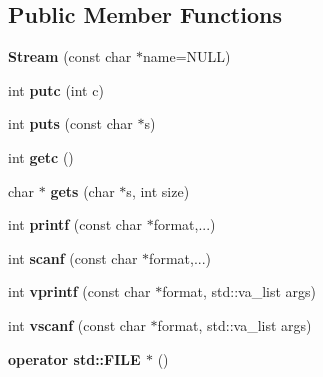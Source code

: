 \subsection*{Public Member Functions}
\begin{DoxyCompactItemize}
\item 
{\bfseries Stream} (const char $\ast$name=N\+U\+LL)\hypertarget{classmbed_1_1Stream_a32d590dce747212c986b9c8fa8f626f8}{}\label{classmbed_1_1Stream_a32d590dce747212c986b9c8fa8f626f8}

\item 
int {\bfseries putc} (int c)\hypertarget{classmbed_1_1Stream_ae948b0f3eaf7736ca0f6a1648e9390d6}{}\label{classmbed_1_1Stream_ae948b0f3eaf7736ca0f6a1648e9390d6}

\item 
int {\bfseries puts} (const char $\ast$s)\hypertarget{classmbed_1_1Stream_aaf7d4a2bb6c38f35d369f51cb2e3ba36}{}\label{classmbed_1_1Stream_aaf7d4a2bb6c38f35d369f51cb2e3ba36}

\item 
int {\bfseries getc} ()\hypertarget{classmbed_1_1Stream_a6167659331a6d841b0f766c4db1333e5}{}\label{classmbed_1_1Stream_a6167659331a6d841b0f766c4db1333e5}

\item 
char $\ast$ {\bfseries gets} (char $\ast$s, int size)\hypertarget{classmbed_1_1Stream_ab5157ace501d836fba9fd3f40b8865d1}{}\label{classmbed_1_1Stream_ab5157ace501d836fba9fd3f40b8865d1}

\item 
int {\bfseries printf} (const char $\ast$format,...)\hypertarget{classmbed_1_1Stream_adca0a93ea6add55996848e0f4e148533}{}\label{classmbed_1_1Stream_adca0a93ea6add55996848e0f4e148533}

\item 
int {\bfseries scanf} (const char $\ast$format,...)\hypertarget{classmbed_1_1Stream_a07d45029be0f9cab42572f717d3d6e09}{}\label{classmbed_1_1Stream_a07d45029be0f9cab42572f717d3d6e09}

\item 
int {\bfseries vprintf} (const char $\ast$format, std\+::va\+\_\+list args)\hypertarget{classmbed_1_1Stream_a8eb2f574cd3dcee5064392b88367d0d7}{}\label{classmbed_1_1Stream_a8eb2f574cd3dcee5064392b88367d0d7}

\item 
int {\bfseries vscanf} (const char $\ast$format, std\+::va\+\_\+list args)\hypertarget{classmbed_1_1Stream_ae15610f53c542f3555c4614001c2c2f8}{}\label{classmbed_1_1Stream_ae15610f53c542f3555c4614001c2c2f8}

\item 
{\bfseries operator std\+::\+F\+I\+L\+E $\ast$} ()\hypertarget{classmbed_1_1Stream_ac18fba9194addd424fe10b7f7cb6376d}{}\label{classmbed_1_1Stream_ac18fba9194addd424fe10b7f7cb6376d}

\end{DoxyCompactItemize}
